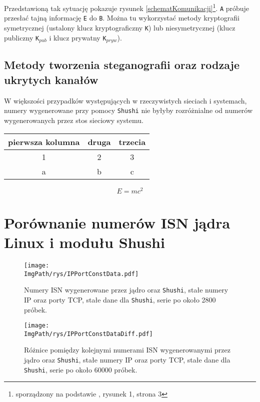 \documentclass[a4paper,12pt,twoside,openany]{report}
\newcommand{\ImgPath}{.}
\newcommand{\tech}{\texttt}
\begin{document}
Przedstawioną tak sytuację pokazuje rysunek 
\ref{schematKomunikacji}\footnote{sporządzony na podstawie 
\cite{schematKomunikacjiPrzypis}, rysunek 1, strona 3}. \tech{A} próbuje 
przesłać tajną informację \tech{E} do \tech{B}. Można tu wykorzystać metody kryptografii symetrycznej (ustalony 
klucz kryptograficzny \tech{K}) lub niesymetrycznej (klucz publiczny 
\tech{K}$_{pub}$ i klucz prywatny \tech{K}$_{pryw}$).

\section{Metody tworzenia steganografii oraz rodzaje ukrytych kanałów}
 W większości przypadków występujących w rzeczywistych sieciach i 
systemach, numery wygenerowane przy pomocy \tech{Shushi} nie byłyby rozróżnialne 
od numerów wygenerowanych przez stos sieciowy systemu.

\begin{tabular}{c|cc}
pierwsza kolumna & druga & trzecia \\ \hline
1 & 2 & 3 \\
a & b & c \\
\end{tabular} 

\begin{equation}
 E = m c^2 \label{einstein}
\end{equation}



\appendix
\chapter{Porównanie numerów ISN jądra Linux i modułu Shushi}
\begin{figure}[!htbp]
	\begin{center}
\centering
\texttt{[image: \\ImgPath/rys/IPPortConstData.pdf]}
\end{center}
	\caption{Numery ISN wygenerowane przez jądro oraz \tech{Shushi}, stałe 
numery IP oraz porty TCP, stałe dane dla \tech{Shushi}, serie po około 2800 
próbek.}
	\label{IPPortConstData}
\end{figure}

\begin{figure}[!htbp]
	\begin{center}
\centering
\texttt{[image: \\ImgPath/rys/IPPortConstDataDiff.pdf]}
\end{center}
	\caption{Różnice pomiędzy kolejnymi numerami ISN wygenerowanymi przez 
jądro oraz \tech{Shushi}, stałe numery IP oraz porty TCP, stałe dane dla 
\tech{Shushi}, serie po około 60000 próbek.}
	\label{IPPortConstDataDiff}
\end{figure}
\end{document}
